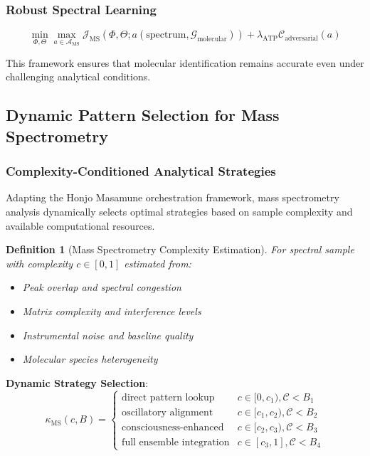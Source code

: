 \documentclass[11pt,a4paper]{article}
\newtheorem{definition}[theorem]{Definition}
\theoremstyle{remark}
\begin{document}
\subsubsection{Robust Spectral Learning}

\begin{equation}
\min_{\Phi,\Theta} \max_{a \in \mathcal{A}_{\text{MS}}} \mathcal{J}_{\text{MS}}(\Phi,\Theta; a(\text{spectrum}, \mathcal{G}_{\text{molecular}})) + \lambda_{\text{ATP}} \mathcal{C}_{\text{adversarial}}(a)
\end{equation}

This framework ensures that molecular identification remains accurate even under challenging analytical conditions.

\subsection{Dynamic Pattern Selection for Mass Spectrometry}

\subsubsection{Complexity-Conditioned Analytical Strategies}

Adapting the Honjo Masamune orchestration framework, mass spectrometry analysis dynamically selects optimal strategies based on sample complexity and available computational resources.

\begin{definition}[Mass Spectrometry Complexity Estimation]
For spectral sample with complexity $c \in [0,1]$ estimated from:
\begin{itemize}
\item Peak overlap and spectral congestion
\item Matrix complexity and interference levels  
\item Instrumental noise and baseline quality
\item Molecular species heterogeneity
\end{itemize}
\end{definition}

\textbf{Dynamic Strategy Selection}:
\begin{equation}
\kappa_{\text{MS}}(c, B) = \begin{cases}
\text{direct pattern lookup} & c \in [0, c_1), \mathcal{C} < B_1\\
\text{oscillatory alignment} & c \in [c_1, c_2), \mathcal{C} < B_2\\
\text{consciousness-enhanced} & c \in [c_2, c_3), \mathcal{C} < B_3\\
\text{full ensemble integration} & c \in [c_3, 1], \mathcal{C} < B_4
\end{cases}
\end{equation}
\end{document}
